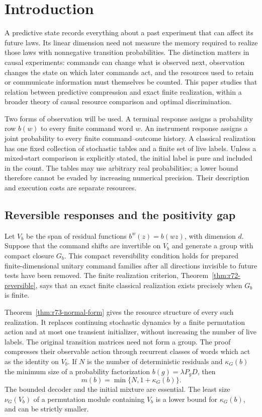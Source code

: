\section{Introduction}\label{sec:current-overview}\label{sec:introduction}
A predictive state records everything about a past experiment that can
affect its future laws. Its linear dimension need not measure the memory
required to realize those laws with nonnegative transition probabilities.
The distinction matters in causal experiments: commands can change what is
observed next, observation changes the state on which later commands act,
and the resources used to retain or communicate information must themselves
be counted. This paper studies that relation between predictive compression
and exact finite realization, within a broader theory of causal resource
comparison and optimal discrimination.

Two forms of observation will be used. A terminal response assigns a
probability row $b(w)$ to every finite command word $w$. An instrument
response assigns a joint probability to every finite command--outcome
history. A classical realization has one fixed collection of stochastic
tables and a finite set of live labels. Unless a mixed-start comparison is
explicitly stated, the initial label is pure and included in the count.
The tables may use arbitrary real probabilities; a lower bound therefore
cannot be evaded by increasing numerical precision. Their description and
execution costs are separate resources.

\subsection*{Reversible responses and the positivity gap}
Let $V_b$ be the span of residual functions $b^w(z)=b(wz)$, with dimension
$d$. Suppose that the command shifts are invertible on $V_b$ and generate
a group with compact closure $G_b$. This compact reversibility condition
holds for prepared finite-dimensional unitary command families after all
directions invisible to future tests have been removed. The finite
realization criterion, Theorem~\ref{thm:r72-reversible}, says that an exact
finite classical realization exists precisely when $G_b$ is finite.

Theorem~\ref{thm:r73-normal-form} gives the resource structure of every
such realization. It replaces continuing stochastic dynamics by a finite
permutation action and at most one transient initializer, without increasing
the number of live labels. The original transition matrices need not form
a group. The proof compresses their observable action through recurrent
classes of words which act as the identity on $V_b$. If $N$ is the number
of deterministic residuals and $\kappa_G(b)$ the minimum size of a
probability factorization $b(g)=\lambda P_gD$, then
\[
 m(b)=\min\{N,1+\kappa_G(b)\}.
\]
The bounded decoder and the initial mixture are essential. The least size
$\nu_G(V_b)$ of a permutation module containing $V_b$ is a lower bound
for $\kappa_G(b)$, and can be strictly smaller.

